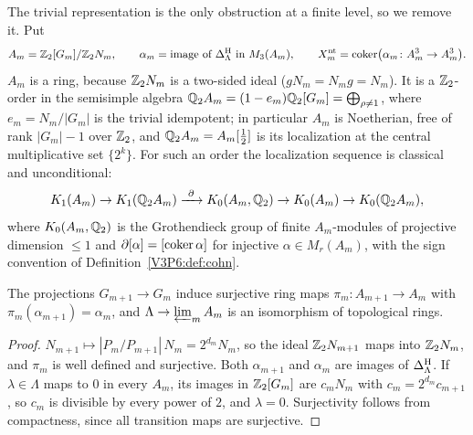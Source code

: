 The trivial representation is the only obstruction at a finite level, so we remove it. Put
\[
A_m=\mathbb{Z}_2[G_m]/\mathbb{Z}_2N_m,\qquad \alpha_m=\text{image of }\Delta^{\mathrm{H}}_\Lambda\text{ in }M_3(A_m),
\qquad X_m^{\mathrm{nt}}=\operatorname{coker}\bigl(\alpha_m\colon A_m^{3}\to A_m^{3}\bigr).
\]
$A_m$ is a ring, because $\mathbb{Z}_2N_m$ is a two-sided ideal ($gN_m=N_mg=N_m$). It is a $\mathbb{Z}_2$-order
in the semisimple algebra $\mathbb{Q}_2A_m=(1-e_m)\mathbb{Q}_2[G_m]=\bigoplus_{\rho\ne1}$, where
$e_m=N_m/|G_m|$ is the trivial idempotent; in particular $A_m$ is Noetherian, free of rank
$|G_m|-1$ over $\mathbb{Z}_2$, and $\mathbb{Q}_2A_m=A_m[\tfrac12]$ is its localization at the central
multiplicative set $\{2^{k}\}$. For such an order the localization sequence is classical and
unconditional:
\[
K_1(A_m)\to K_1(\mathbb{Q}_2A_m)\xrightarrow{\ \partial\ }K_0(A_m,\mathbb{Q}_2)\to K_0(A_m)\to K_0(\mathbb{Q}_2A_m),
\]
where $K_0(A_m,\mathbb{Q}_2)$ is the Grothendieck group of finite $A_m$-modules of projective dimension
$\le1$ and $\partial[\alpha]=[\operatorname{coker}\alpha]$ for injective $\alpha\in M_r(A_m)$, with the sign
convention of Definition~\ref{V3P6:def:cohn}.

\begin{lemma}\label{V3P6:lem:pro2limit}
The projections $G_{m+1}\to G_m$ induce surjective ring maps $\pi_m\colon A_{m+1}\to A_m$ with
$\pi_m(\alpha_{m+1})=\alpha_m$, and $\Lambda\to\varprojlim_mA_m$ is an isomorphism of
topological rings.
\end{lemma}

\begin{proof}
$N_{m+1}\mapsto|P_m/P_{m+1}|\,N_m=2^{d_m}N_m$, so the ideal $\mathbb{Z}_2N_{m+1}$ maps into $\mathbb{Z}_2N_m$,
and $\pi_m$ is well defined and surjective. Both $\alpha_{m+1}$ and $\alpha_m$ are images of
$\Delta^{\mathrm{H}}_\Lambda$. If $\lambda\in\Lambda$ maps to $0$ in every $A_m$, its images in
$\mathbb{Z}_2[G_m]$ are $c_mN_m$ with $c_m=2^{d_m}c_{m+1}$, so $c_m$ is divisible by every power of $2$,
and $\lambda=0$. Surjectivity follows from compactness, since all transition maps are
surjective.
\end{proof}

